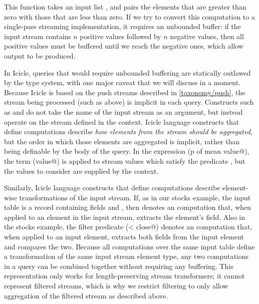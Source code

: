 This function takes an input list \Ic@xs@, and pairs the elements that are greater than zero with those that are less than zero.
If we try to convert this computation to a single-pass streaming implementation, it requires an unbounded buffer: if the input stream contains $n$ positive values followed by $n$ negative values, then all positive values must be buffered until we reach the negative ones, which allow output to be produced.


In Icicle, queries that would require unbounded buffering are statically outlawed by the type system, with one major caveat that we will discuss in a moment.
Because Icicle is based on the push streams described in \cref{taxonomy/push}, the stream being processed (such as \Ic@xs@ above) is implicit in each query.
Constructs such as \Ic@filter@ and \Ic@fold@ do not take the name of the input stream as an argument, but instead operate on the stream defined in the context.
Icicle language constructs that define \Ic@Aggregate@ computations describe \emph{how elements from the stream should be aggregated}, but the order in which those elements are aggregated is implicit, rather than being definable by the body of the query.
In the expression (\Ic@filter p of mean value@), the term (\Ic@mean value@) is applied to stream values which satisfy the predicate \Ic@p@, but the values to consider are supplied by the context.

Similarly, Icicle language constructs that define \Ic@Element@ computations describe element-wise transformations of the input stream.
If, as in our stocks example, the input table is a record containing fields \Ic@open@ and \Ic@close@, then \Ic@open@ denotes an \Ic@Element@ computation that, when applied to an element in the input stream, extracts the element's \Ic@open@ field.
Also in the stocks example, the filter predicate (\Ic@open < close@) denotes an \Ic@Element@ computation that, when applied to an input element, extracts both fields from the input element and compares the two.
Because all \Ic@Element@ computations over the same input table define a transformation of the same input stream element type, any two \Ic@Element@ computations in a query can be combined together without requiring any buffering.
This \Ic@Element@ representation only works for length-preserving stream transformers; it cannot represent filtered streams, which is why we restrict filtering to only allow aggregation of the filtered stream as described above.

